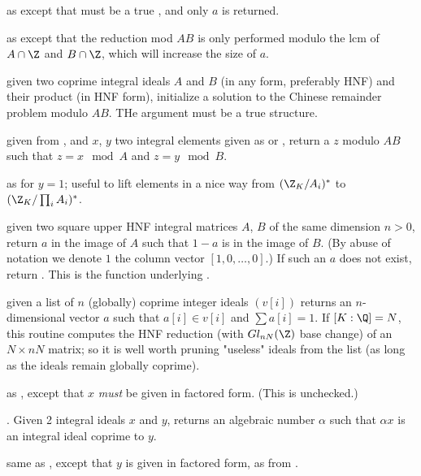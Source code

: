  as  except
that  must be a true , and only $a$ is returned.

 as 
except that the reduction mod $AB$ is only performed modulo the lcm
of $A \cap \Z$ and $B\cap \Z$, which will increase the size of $a$.

 given two coprime
integral ideals $A$ and $B$ (in any form, preferably HNF) and
their product  (in HNF form), initialize a solution to the Chinese
remainder problem modulo $AB$. THe  argument must be a true 
structure.

 given  from
, and $x$, $y$ two integral elements given as 
or , return a $z$ modulo $AB$ such that
$z = x \mod A$ and $z = y \mod B$.

 as  for $y = 1$; useful
to lift elements in a nice way from $(\Z_K/A_i)^*$ to $(\Z_K/\prod_i A_i)^*$.

 given two square upper HNF integral
matrices $A$, $B$ of the same dimension $n > 0$, return $a$ in the image of
$A$ such that $1-a$ is in the image of $B$. (By abuse of notation we denote
$1$ the column vector $[1,0,\dots,0]$.) If such an $a$ does not exist, return
. This is the function underlying .

 given a list of $n$ (globally)
coprime integer ideals $(v[i])$ returns an $n$-dimensional vector $a$ such that
$a[i]\in v[i]$ and $\sum a[i] = 1$. If $[K:\Q] = N$, this routine computes
the HNF reduction (with $Gl_{nN}(\Z)$ base change) of an $N\times nN$ matrix;
so it is well worth pruning "useless" ideals from the list (as long as the
ideals remain globally coprime).

 as , except that
$x$ \emph{must} be given in factored form. (This is unchecked.)

. Given 2 integral ideals $x$ and
$y$, returns an algebraic number $\alpha$ such that
$\alpha x$ is an integral ideal coprime to $y$.

 same as
, except that $y$ is given in factored form, as from
.

